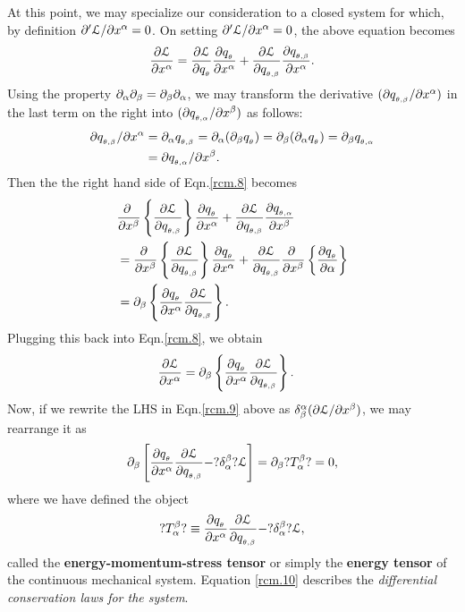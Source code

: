 At this point, we may specialize our consideration to a 
closed system for which, by definition  ${\partial}' 
\EuScript{L}/{\partial} x^{{\alpha}}= 0$. On setting ${\partial}' 
\EuScript{L}/{\partial} x^{{\alpha}}= 0$, the above equation becomes
\begin{align}\label{rcm.8}
\frac{{\partial} \EuScript{L}} {{\partial} x^{{\alpha}}}
 =\frac{{\partial}\EuScript{L}}{{\partial} q_{_{{\theta}}} }
\frac{{\partial} q_{_{{\theta}}} }{{\partial} x^{{\alpha}}} +
\frac{{\partial}\EuScript{L}} {{\partial} q_{_{{\theta},{{\beta}}}}} \frac{{\partial} 
q_{_{{\theta},{{\beta}}}}} {{\partial} x^{{\alpha}}}.
\end{align}
Using the property ${\partial}_{{\alpha}}{\partial}_{{\beta}}={\partial}_{{\beta}}{\partial}_{{\alpha}} 
$, we may  transform the derivative  $({\partial} 
q_{_{{\theta},{{\beta}}}}/{\partial} x^{{\alpha}})$  in the last term on the right 
into $({\partial} q_{_{{\theta},{{\alpha}}}}/{\partial} x^{{\beta}})$ as follows:
\begin{align*}
{\ensuremath{\partial}} q_{_{{\theta},{{\beta}}}}/{\partial} x^{{\alpha}}&= {\partial}_{{\alpha}}
q_{_{{\theta},{{\beta}}}} ={\partial}_{{\alpha}}({\partial}_{{\beta}}q_{_{{\theta}}} ) 
={\partial}_{{\beta}}({\partial}_{{\alpha}}q_{_{{\theta}}}  )= {\partial}_{{\beta}} 
q_{_{{\theta},{{\alpha}}}} \notag\\
&={\partial} q_{_{{\theta},{{\alpha}}}}/{\partial} x^{{\beta}}.
\end{align*}
Then the the right hand side of Eqn.\eqref{rcm.8} becomes
\begin{align*}
&\frac{{\partial}\;}
{{\partial} x^{{\beta}}} \left\{\frac{{\partial} \EuScript{L}}
{{\partial} q_{_{{\theta},{{\beta}}}}} \right\}
\frac{{\partial} q_{_{{\theta}}}  }{{\partial} x^{{\alpha}}}+
\frac{{\partial} \EuScript{L}}{{\partial} q_{_{{\theta},{{\beta}}}}}
\frac{{\partial} q_{_{{\theta},{{\alpha}}}}}{{\partial} x^{{\beta}}}\\
&=\frac{{\partial}\;}
{{\partial} x^{{\beta}}} \left\{\frac{{\partial} \EuScript{L}}
{{\partial} q_{_{{\theta},{{\beta}}}}} \right\}
\frac{{\partial} q_{_{{\theta}}}  }{{\partial} x^{{\alpha}}}+
\frac{{\partial} \EuScript{L}}{{\partial} q_{_{{\theta},{{\beta}}}}}
\frac{{\partial}\;}{{\partial} x^{{\beta}}}\left\{\frac{{\partial}q_{_{{\theta}}}  }
{{\partial}{{\alpha}}} \right\}\notag\\&=
{\partial}_{{\beta}}  \left\{\frac{{\partial} q_{_{{\theta}}}  } {{\partial} x^{{\alpha}}}
\frac{{\partial} \EuScript{L}}{{\partial} q_{_{{\theta},{{\beta}}}}}\right\}.
\end{align*}
Plugging this back into Eqn.\eqref{rcm.8}, we obtain
\begin{align}\label{rcm.9}
\frac{{\partial} \EuScript{L}}{{\partial} x^{{\alpha}}} & =
{\partial}_{{\beta}}  \left\{\frac{{\partial} q_{_{{\theta}}}  } {{\partial} x^{{\alpha}}}
\frac{{\partial} \EuScript{L}}{{\partial} q_{_{{\theta},{{\beta}}}}}\right\}.
\end{align}
Now, if we rewrite the LHS in Eqn.\eqref{rcm.9} above as  
$\delta^{{\alpha}}_{{\beta}} ({\partial} \EuScript{L}/{\partial} x^{{\beta}}) $, we may
rearrange it as
\begin{align}\label{rcm.10}
{\ensuremath{\partial}}_{{\beta}}\left[\frac{{\partial} q_{_{{\theta}}}  }{{\partial} x^{{\alpha}}}
 \frac{{\partial} \EuScript{L}}{{\partial} q_{_{{\theta},{{\beta}}}}} -
?\delta^{{\beta}}_{{\alpha}}?\EuScript{L}\right]
={\partial}_{{\beta}}?T^{{\beta}}_{{\alpha}}?=0,
\end{align}
where we have defined the object
\begin{align}\label{rcm.11}
 ?T^{{\beta}}_{{\alpha}}? \equiv \frac{{\partial} q_{_{{\theta}}}  }{{\partial} x^{{\alpha}}}
\frac{{\partial} \EuScript{L}}{{\partial} q_{_{{\theta},{{\beta}}}}}
-?\delta^{{\beta}}_{{\alpha}}? \EuScript{L},
\end{align}
called the \textbf{energy-momentum-stress 
tensor} 
or simply the \textbf{energy tensor} of the continuous 
mechanical system.  Equation \eqref{rcm.10} describes  
the \textsl{differential conservation  laws for the 
system}.

